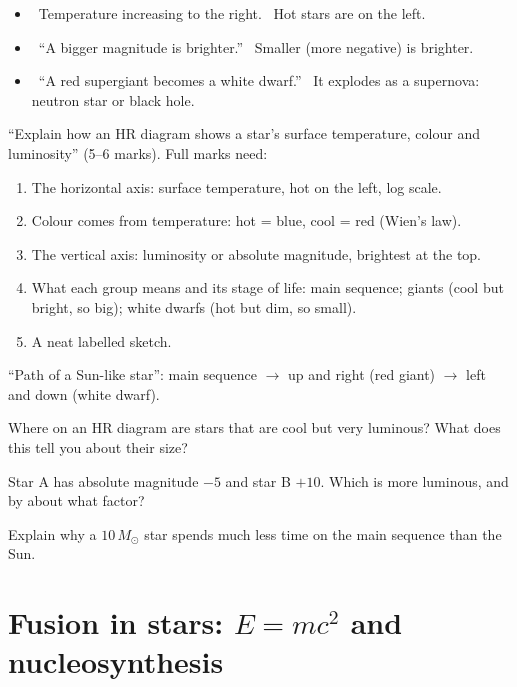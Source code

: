 \begin{mistakes}
\begin{itemize}
  \item \xmark\ Temperature increasing to the right. \cmark\ Hot stars are on the left.
  \item \xmark\ ``A bigger magnitude is brighter.'' \cmark\ Smaller (more negative) is brighter.
  \item \xmark\ ``A red supergiant becomes a white dwarf.'' \cmark\ It explodes as a
        supernova: neutron star or black hole.
\end{itemize}
\end{mistakes}

\begin{examtip}
``Explain how an HR diagram shows a star's surface temperature, colour and luminosity''
(5--6 marks). Full marks need:
\begin{enumerate}
  \item The horizontal axis: surface temperature, hot on the left, log scale.
  \item Colour comes from temperature: hot = blue, cool = red (Wien's law).
  \item The vertical axis: luminosity or absolute magnitude, brightest at the top.
  \item What each group means and its stage of life: main sequence; giants (cool but
        bright, so big); white dwarfs (hot but dim, so small).
  \item A neat labelled sketch.
\end{enumerate}
``Path of a Sun-like star'': main sequence $\to$ up and right (red giant) $\to$ left and
down (white dwarf).
\end{examtip}

\begin{quickcheck}
  \item Where on an HR diagram are stars that are cool but very luminous? What does this
        tell you about their size?
  \item Star A has absolute magnitude $-5$ and star B $+10$. Which is more luminous, and
        by about what factor?
  \item Explain why a $10\,M_\odot$ star spends much less time on the main sequence than
        the Sun.
\end{quickcheck}

\section{Fusion in stars: \texorpdfstring{$E = mc^2$}{E = mc2} and nucleosynthesis}\label{ch1:sec:fusion}

